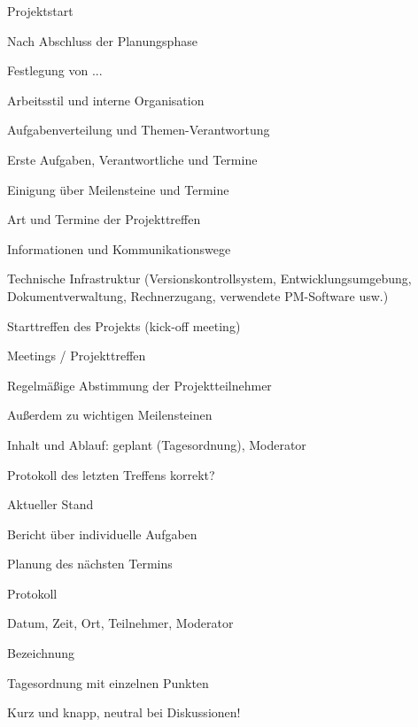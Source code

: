 \documentclass[a4paper]{article}
\begin{document}
\begin{multicols}{3}
  Projektstart
  \begin{itemize*}
    \item Nach Abschluss der Planungsphase
    \item Festlegung von ...
          \begin{itemize*}
            \item Arbeitsstil und interne Organisation
            \item Aufgabenverteilung und Themen-Verantwortung
            \item Erste Aufgaben, Verantwortliche und Termine
            \item Einigung über Meilensteine und Termine
            \item Art und Termine der Projekttreffen
            \item Informationen und Kommunikationswege
            \item Technische Infrastruktur (Versionskontrollsystem, Entwicklungsumgebung, Dokumentverwaltung, Rechnerzugang, verwendete PM-Software usw.)
          \end{itemize*}
    \item Starttreffen des Projekts (kick-off meeting)
  \end{itemize*}

  Meetings / Projekttreffen
  \begin{itemize*}
    \item Regelmäßige Abstimmung der Projektteilnehmer
          \begin{itemize*}
            \item Außerdem zu wichtigen Meilensteinen
          \end{itemize*}
    \item Inhalt und Ablauf: geplant (Tagesordnung), Moderator
          \begin{itemize*}
            \item Protokoll des letzten Treffens korrekt?
            \item Aktueller Stand
            \item Bericht über individuelle Aufgaben
            \item Planung des nächsten Termins
          \end{itemize*}
    \item Protokoll
          \begin{itemize*}
            \item Datum, Zeit, Ort, Teilnehmer, Moderator
            \item Bezeichnung
            \item Tagesordnung mit einzelnen Punkten
            \item Kurz und knapp, neutral bei Diskussionen!
          \end{itemize*}
  \end{itemize*}


\end{multicols}
\end{document}

